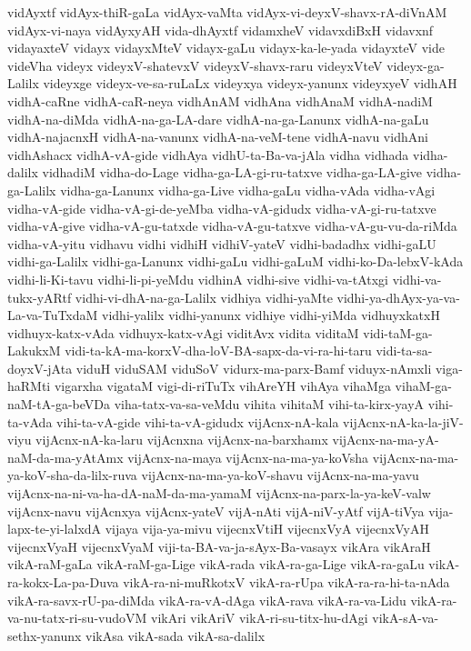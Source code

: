 {vidAyxtf
vidAyx-thiR-gaLa
vidAyx-vaMta
vidAyx-vi-deyxV-shavx-rA-diVnAM
vidAyx-vi-naya
vidAyxyAH
vida-dhAyxtf
vidamxheV
vidavxdiBxH
vidavxnf
vidayaxteV
vidayx
vidayxMteV
vidayx-gaLu
vidayx-ka-le-yada
vidayxteV
vide
videVha
videyx
videyxV-shatevxV
videyxV-shavx-raru
videyxVteV
videyx-ga-Lalilx
videyxge
videyx-ve-sa-ruLaLx
videyxya
videyx-yanunx
videyxyeV
vidhAH
vidhA-caRne
vidhA-caR-neya
vidhAnAM
vidhAna
vidhAnaM
vidhA-nadiM
vidhA-na-diMda
vidhA-na-ga-LA-dare
vidhA-na-ga-Lanunx
vidhA-na-gaLu
vidhA-najacnxH
vidhA-na-vanunx
vidhA-na-veM-tene
vidhA-navu
vidhAni
vidhAshacx
vidhA-vA-gide
vidhAya
vidhU-ta-Ba-va-jAla
vidha
vidhada
vidha-dalilx
vidhadiM
vidha-do-Lage
vidha-ga-LA-gi-ru-tatxve
vidha-ga-LA-give
vidha-ga-Lalilx
vidha-ga-Lanunx
vidha-ga-Live
vidha-gaLu
vidha-vAda
vidha-vAgi
vidha-vA-gide
vidha-vA-gi-de-yeMba
vidha-vA-gidudx
vidha-vA-gi-ru-tatxve
vidha-vA-give
vidha-vA-gu-tatxde
vidha-vA-gu-tatxve
vidha-vA-gu-vu-da-riMda
vidha-vA-yitu
vidhavu
vidhi
vidhiH
vidhiV-yateV
vidhi-badadhx
vidhi-gaLU
vidhi-ga-Lalilx
vidhi-ga-Lanunx
vidhi-gaLu
vidhi-gaLuM
vidhi-ko-Da-lebxV-kAda
vidhi-li-Ki-tavu
vidhi-li-pi-yeMdu
vidhinA
vidhi-sive
vidhi-va-tAtxgi
vidhi-va-tukx-yARtf
vidhi-vi-dhA-na-ga-Lalilx
vidhiya
vidhi-yaMte
vidhi-ya-dhAyx-ya-va-La-va-TuTxdaM
vidhi-yalilx
vidhi-yanunx
vidhiye
vidhi-yiMda
vidhuyxkatxH
vidhuyx-katx-vAda
vidhuyx-katx-vAgi
viditAvx
vidita
viditaM
vidi-taM-ga-LakukxM
vidi-ta-kA-ma-korxV-dha-loV-BA-sapx-da-vi-ra-hi-taru
vidi-ta-sa-doyxV-jAta
viduH
viduSAM
viduSoV
vidurx-ma-parx-Bamf
viduyx-nAmxli
viga-haRMti
vigarxha
vigataM
vigi-di-riTuTx
vihAreYH
vihAya
vihaMga
vihaM-ga-naM-tA-ga-beVDa
viha-tatx-va-sa-veMdu
vihita
vihitaM
vihi-ta-kirx-yayA
vihi-ta-vAda
vihi-ta-vA-gide
vihi-ta-vA-gidudx
vijAcnx-nA-kala
vijAcnx-nA-ka-la-jiV-viyu
vijAcnx-nA-ka-laru
vijAcnxna
vijAcnx-na-barxhamx
vijAcnx-na-ma-yA-naM-da-ma-yAtAmx
vijAcnx-na-maya
vijAcnx-na-ma-ya-koVsha
vijAcnx-na-ma-ya-koV-sha-da-lilx-ruva
vijAcnx-na-ma-ya-koV-shavu
vijAcnx-na-ma-yavu
vijAcnx-na-ni-va-ha-dA-naM-da-ma-yamaM
vijAcnx-na-parx-la-ya-keV-valw
vijAcnx-navu
vijAcnxya
vijAcnx-yateV
vijA-nAti
vijA-niV-yAtf
vijA-tiVya
vija-lapx-te-yi-lalxdA
vijaya
vija-ya-mivu
vijecnxVtiH
vijecnxVyA
vijecnxVyAH
vijecnxVyaH
vijecnxVyaM
viji-ta-BA-va-ja-sAyx-Ba-vasayx
vikAra
vikAraH
vikA-raM-gaLa
vikA-raM-ga-Lige
vikA-rada
vikA-ra-ga-Lige
vikA-ra-gaLu
vikA-ra-kokx-La-pa-Duva
vikA-ra-ni-muRkotxV
vikA-ra-rUpa
vikA-ra-ra-hi-ta-nAda
vikA-ra-savx-rU-pa-diMda
vikA-ra-vA-dAga
vikA-rava
vikA-ra-va-Lidu
vikA-ra-va-nu-tatx-ri-su-vudoVM
vikAri
vikAriV
vikA-ri-su-titx-hu-dAgi
vikA-sA-va-sethx-yanunx
vikAsa
vikA-sada
vikA-sa-dalilx
}
